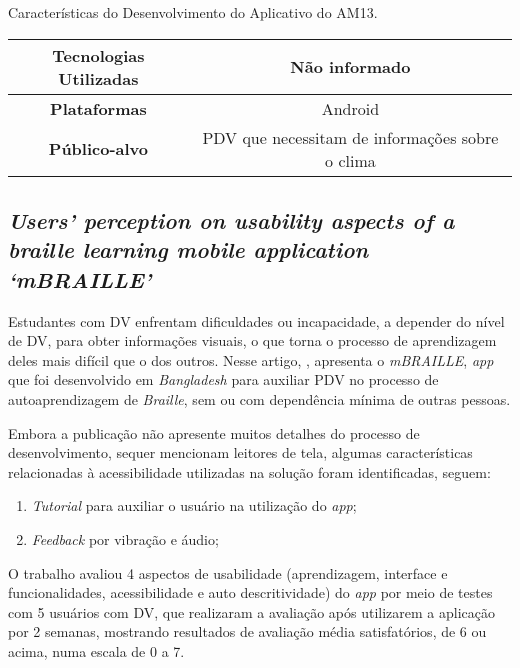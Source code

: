 \begin{quadro}[htb!]
  \caption{\label{qua-car-am13}Características do Desenvolvimento do Aplicativo do AM13.}
  \begin{tabular}{|c|c|}
    \hline
    \textbf{Tecnologias Utilizadas} & Não informado                                   \\ \hline
    \textbf{Plataformas}            & Android                                         \\ \hline
    \textbf{Público-alvo}           & PDV que necessitam de informações sobre o clima \\
    \hline
  \end{tabular}
\end{quadro}

\subsection{\emph{Users’ perception on usability aspects of a braille learning mobile application ‘mBRAILLE’}}

Estudantes com DV enfrentam dificuldades ou incapacidade, a depender do nível de DV, para obter informações visuais, o que torna
o processo de aprendizagem deles mais difícil que o dos outros. Nesse artigo, , apresenta o \emph{mBRAILLE},
\emph{app} que foi desenvolvido em \emph{Bangladesh} para auxiliar PDV no processo de autoaprendizagem de \emph{Braille}, sem ou com
dependência mínima de outras pessoas.

Embora a publicação não apresente muitos detalhes do processo de desenvolvimento, sequer
mencionam leitores de tela, algumas características relacionadas à acessibilidade utilizadas na solução foram identificadas, seguem:

\begin{enumerate}
  \item \emph{Tutorial} para auxiliar o usuário na utilização do \emph{app};
  \item \emph{Feedback} por vibração e áudio;
\end{enumerate}

O trabalho avaliou 4 aspectos de usabilidade (aprendizagem, interface e funcionalidades, acessibilidade e auto descritividade)
do \emph{app} por meio de testes com 5 usuários com DV, que realizaram a avaliação após utilizarem a aplicação por 2 semanas,
mostrando resultados de avaliação média satisfatórios, de 6 ou acima, numa escala de 0 a 7.

